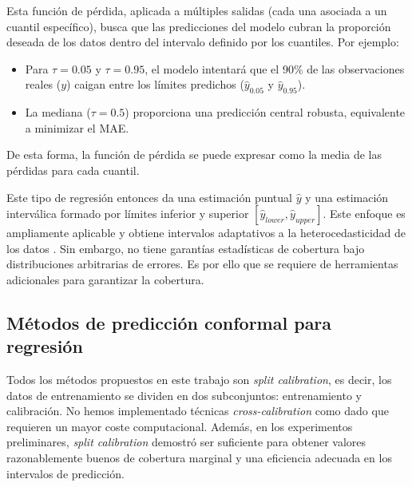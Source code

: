 \begin{itemize}
    Esta función de pérdida, aplicada a múltiples salidas (cada una asociada a un cuantil específico), busca 
    que las predicciones del modelo cubran la proporción deseada de los datos dentro del intervalo definido 
    por los cuantiles. Por ejemplo:

    \begin{itemize}

        \item Para $\tau = 0.05$ y $\tau = 0.95$, el modelo intentará que el 90\% de las observaciones reales 
        ($y$) caigan entre los límites predichos ($\hat{y}_{0.05}$ y $\hat{y}_{0.95}$).

        \item La mediana ($\tau = 0.5$) proporciona una predicción central robusta, equivalente a minimizar 
        el MAE. 
        
    \end{itemize}

    De esta forma, la función de pérdida se puede expresar como la media de las pérdidas para cada cuantil.

\end{itemize}

Este tipo de regresión entonces da una estimación puntual $\hat{y}$ y una estimación interválica formado por 
límites inferior y superior $\left[ \hat{y}_{lower}, \hat{y}_{upper} \right]$. Este enfoque es ampliamente
aplicable y obtiene intervalos adaptativos a la heterocedasticidad de los datos \cite{romano2019}. 
Sin embargo, no tiene garantías estadísticas de cobertura bajo distribuciones arbitrarias de errores.
Es por ello que se requiere de herramientas adicionales para garantizar la cobertura.


\subsection{Métodos de predicción conformal para regresión}

Todos los métodos propuestos en este trabajo son \textit{split calibration}, es decir, los datos de 
entrenamiento se dividen en dos subconjuntos: entrenamiento y calibración. No hemos implementado técnicas 
\textit{cross-calibration} como \cite{barber2021} dado que requieren un mayor coste computacional.
Además, en los experimentos preliminares, \textit{split calibration} demostró ser suficiente para obtener
valores razonablemente buenos de cobertura marginal y una eficiencia adecuada en los intervalos de predicción.

